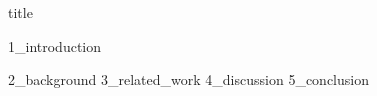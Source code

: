 \documentclass{article}
\begin{document}
{title}

\frontmatter

\tableofcontents


\mainmatter


{1_introduction}

{2_background}
{3_related_work}
{4_discussion}
{5_conclusion}
\newpage



\end{document}
